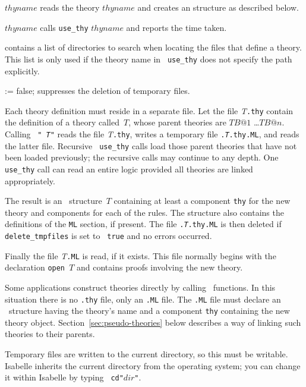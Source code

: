 \begin{ttdescription}
\item[\ttindexbold{use_thy} $thyname$]
  reads the theory $thyname$ and creates an \ML{} structure as described below.

\item[\ttindexbold{time_use_thy} $thyname$]
  calls {\tt use_thy} $thyname$ and reports the time taken.

\item[\ttindexbold{loadpath}]
  contains a list of directories to search when locating the files that
  define a theory.  This list is only used if the theory name in {\tt
    use_thy} does not specify the path explicitly.

\item[\ttindexbold{delete_tmpfiles} := false;]
suppresses the deletion of temporary files.
\end{ttdescription}
%
Each theory definition must reside in a separate file.  Let the file {\it
  T}{\tt.thy} contain the definition of a theory called~$T$, whose parent
theories are $TB@1$ \dots $TB@n$.  Calling ~{\tt"{\it
  T\/}"} reads the file {\it T}{\tt.thy}, writes a temporary \ML{}
file {\tt.{\it T}.thy.ML}, and reads the latter file.  Recursive {\tt
  use_thy} calls load those parent theories that have not been loaded
previously; the recursive calls may continue to any depth.  One {\tt use_thy}
call can read an entire logic provided all theories are linked appropriately.

The result is an \ML\ structure~$T$ containing at least a component {\tt thy}
for the new theory and components for each of the rules.  The structure also
contains the definitions of the {\tt ML} section, if present.  The file
{\tt.{\it T}.thy.ML} is then deleted if {\tt delete_tmpfiles} is set to {\tt
true} and no errors occurred.

Finally the file {\it T}{\tt.ML} is read, if it exists.  This file normally
begins with the declaration {\tt open~$T$} and contains proofs involving
the new theory.

Some applications construct theories directly by calling \ML\ functions.  In
this situation there is no {\tt.thy} file, only an {\tt.ML} file.  The
{\tt.ML} file must declare an \ML\ structure having the theory's name and a
component {\tt thy} containing the new theory object.
Section~\ref{sec:pseudo-theories} below describes a way of linking such
theories to their parents.

\begin{warn}
  Temporary files are written to the current directory, so this must be
  writable.  Isabelle inherits the current directory from the operating
  system; you can change it within Isabelle by typing {\tt
  cd"$dir$"}.
\end{warn}


